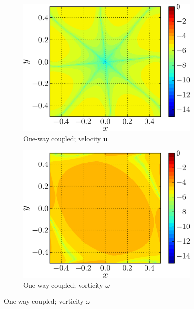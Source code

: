 \begin{figure}[!b]
     \begin{subfigure}[t]{0.45\textwidth}
             \includegraphics[width=\linewidth]{./figures/validation/lambOseent2/lambOseen_oneway_vErrorFinal_compressed-crop.png}
             \caption{One-way coupled; velocity $\mathbf{u}$}
             \label{fig:lambOseen_oneway_vErrorFinal}
     \end{subfigure}
     \qquad
     \begin{subfigure}[t]{0.45\textwidth}
             \includegraphics[width=\linewidth]{./figures/validation/lambOseent2/lambOseen_oneway_wErrorFinal_compressed-crop.png}
             \caption{One-way coupled; vorticity $\omega$}
             \label{fig:lambOseen_oneway_wErrorFinal}
     \end{subfigure}     
   

\end{figure}
